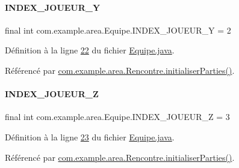 \paragraph{\texorpdfstring{I\+N\+D\+E\+X\+\_\+\+J\+O\+U\+E\+U\+R\+\_\+Y}{INDEX\_JOUEUR\_Y}}
{\footnotesize\ttfamily final int com.\+example.\+area.\+Equipe.\+I\+N\+D\+E\+X\+\_\+\+J\+O\+U\+E\+U\+R\+\_\+Y = 2\hspace{0.3cm}{\ttfamily [static]}}



Définition à la ligne \hyperlink{_equipe_8java_source_l00022}{22} du fichier \hyperlink{_equipe_8java_source}{Equipe.\+java}.



Référencé par \hyperlink{_rencontre_8java_source_l00081}{com.\+example.\+area.\+Rencontre.\+initialiser\+Parties()}.

\mbox{\label{classcom_1_1example_1_1area_1_1_equipe_a50e1c2cbd7d24c8c5b4f0f4de1652621}} 
\paragraph{\texorpdfstring{I\+N\+D\+E\+X\+\_\+\+J\+O\+U\+E\+U\+R\+\_\+Z}{INDEX\_JOUEUR\_Z}}
{\footnotesize\ttfamily final int com.\+example.\+area.\+Equipe.\+I\+N\+D\+E\+X\+\_\+\+J\+O\+U\+E\+U\+R\+\_\+Z = 3\hspace{0.3cm}{\ttfamily [static]}}



Définition à la ligne \hyperlink{_equipe_8java_source_l00023}{23} du fichier \hyperlink{_equipe_8java_source}{Equipe.\+java}.



Référencé par \hyperlink{_rencontre_8java_source_l00081}{com.\+example.\+area.\+Rencontre.\+initialiser\+Parties()}.

\mbox{\label{classcom_1_1example_1_1area_1_1_equipe_a13f5e9288dec5f11829e1a7ccc21cdc9}} 
